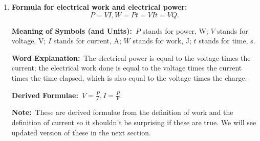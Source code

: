 \documentclass[8pt]{article}
\newcommand{\MeanSymb}{\textbf{Meaning of Symbols (and Units):}\ }
\newcommand{\WordExpl}{\textbf{Word Explanation:}\ }
\newcommand{\DeriForm}{\textbf{Derived Formulae:}\ }
\newcommand{\Note}{\textbf{Note:}\ }
\begin{document}
\begin{enumerate}
                \DeriForm \(Q = It, t = \frac{Q}{I}\).

                \Note We don't care about \(I = \frac{\Delta Q}{\Delta t}\) because we only study constant current at this stage. Current is \textbf{not} a vector, but current density is (we don't need to know that yet but just fyi.)

                \item \textbf{Formula for electrical work and electrical power:}
                \[
                    P = VI, W = Pt = VIt = VQ.
                \]

                \MeanSymb \(P\) stands for power, \unit{\watt}; \(V\) stands for voltage, \unit{\volt}; \(I\) stands for current, \unit{\ampere}; \(W\) stands for work, \unit{\joule}; \(t\) stands for time, \unit{\second}.

                \WordExpl The electrical power is equal to the voltage times the current; the electrical work done is equal to the voltage times the current times the time elapsed, which is also equal to the voltage times the charge.

                \DeriForm \(V = \frac{P}{I}, I = \frac{P}{V}\).

                \Note These are derived formulae from the definition of work and the definition of current so it shouldn't be surprising if these are true. We will see updated version of these in the next section.
            \end{enumerate}
\end{document}
